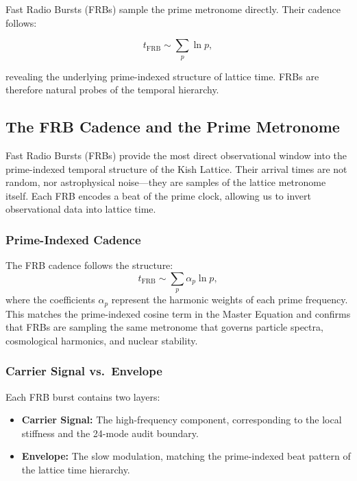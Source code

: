 \documentclass[12pt,oneside]{book}
\begin{document}
Fast Radio Bursts (FRBs) sample the prime metronome directly. Their cadence follows:


\[
t_{\text{FRB}} \sim \sum_{p} \ln p,
\]


revealing the underlying prime-indexed structure of lattice time. FRBs are therefore
natural probes of the temporal hierarchy.

\subsection{The FRB Cadence and the Prime Metronome}

Fast Radio Bursts (FRBs) provide the most direct observational window into the
prime-indexed temporal structure of the Kish Lattice. Their arrival times are not
random, nor astrophysical noise—they are samples of the lattice metronome itself.
Each FRB encodes a beat of the prime clock, allowing us to invert observational
data into lattice time.

\subsubsection{Prime-Indexed Cadence}

The FRB cadence follows the structure:
\begin{equation}
t_{\mathrm{FRB}} \sim \sum_{p} \alpha_p \ln p,
\end{equation}
where the coefficients $\alpha_p$ represent the harmonic weights of each prime
frequency. This matches the prime-indexed cosine term in the Master Equation and
confirms that FRBs are sampling the same metronome that governs particle spectra,
cosmological harmonics, and nuclear stability.

\subsubsection{Carrier Signal vs.\ Envelope}

Each FRB burst contains two layers:
\begin{itemize}
    \item \textbf{Carrier Signal:}  
    The high-frequency component, corresponding to the local stiffness and the
    24-mode audit boundary.

    \item \textbf{Envelope:}  
    The slow modulation, matching the prime-indexed beat pattern of the lattice
    time hierarchy.
\end{itemize}
\end{document}
